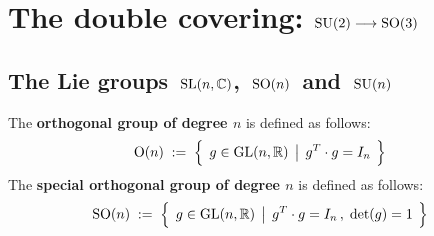 

\chapter{The double covering: $\textnormal{SU}(2) \longrightarrow \textnormal{SO}(3)$}
\setcounter{theorem}{0}
\setcounter{equation}{0}


\renewcommand{\theenumi}{\roman{enumi}}
\renewcommand{\labelenumi}{\textnormal{(\theenumi)}$\;\;$}


\section{The Lie groups  \,$\textnormal{SL}(n,\mathbb{C})$,\, $\textnormal{SO}(n)$\, and \,$\textnormal{SU}(n)$}



\vskip 0.3cm
\begin{definition}
\mbox{}
\vskip 0.1cm
\noindent
The \textbf{orthogonal group of degree $n$} is defined as follows:
\begin{equation*}
\textnormal{O}(n)
\; := \;
	\left\{\;\,
		g \overset{{\color{white}.}}{\in} \textnormal{GL}(n,\Re)
		\;\left\vert\;\,
			g^{T} \cdot g = I_{n}
			\right.
		\;\right\}
\end{equation*}
The \textbf{special orthogonal group of degree $n$} is defined as follows:
\begin{equation*}
\textnormal{SO}(n)
\; := \;
	\left\{\;\,
		g \overset{{\color{white}.}}{\in} \textnormal{GL}(n,\Re)
		\;\left\vert\;\,
			g^{T} \cdot g = I_{n}\,,
			\;
			\textnormal{det}(g) = 1
			\right.
		\;\right\}
\end{equation*}
\end{definition}


